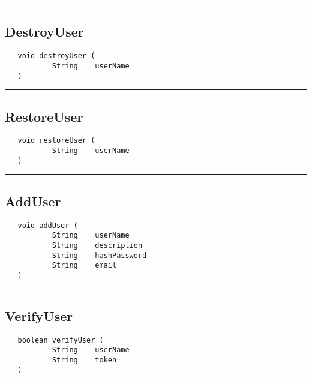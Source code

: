 \rule{15cm}{2pt}
\subsection{DestroyUser}
\label{Api:DestroyUser}
\begin{verbatim}
   void destroyUser (
           String    userName
   )
\end{verbatim}



\rule{15cm}{2pt}
\subsection{RestoreUser}
\label{Api:RestoreUser}
\begin{verbatim}
   void restoreUser (
           String    userName
   )
\end{verbatim}



\rule{15cm}{2pt}
\subsection{AddUser}
\label{Api:AddUser}
\begin{verbatim}
   void addUser (
           String    userName
           String    description
           String    hashPassword
           String    email
   )
\end{verbatim}



\rule{15cm}{2pt}
\subsection{VerifyUser}
\label{Api:VerifyUser}
\begin{verbatim}
   boolean verifyUser (
           String    userName
           String    token
   )
\end{verbatim}



